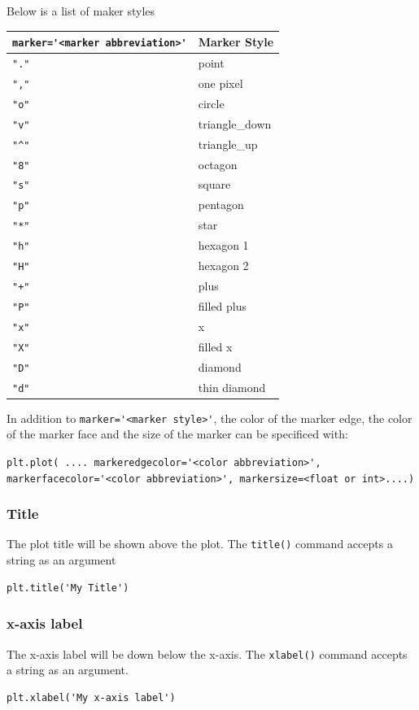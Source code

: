 \documentclass{book}
\begin{document}
Below is a list of maker styles

\begin{longtable}[]{@{}ll@{}}
\toprule
\lstinline!marker='<marker abbreviation>'! & Marker Style\tabularnewline
\midrule
\endhead
\lstinline!"."! & point\tabularnewline
\lstinline!","! & one pixel\tabularnewline
\lstinline!"o"! & circle\tabularnewline
\lstinline!"v"! & triangle\_down\tabularnewline
\lstinline!"^"! & triangle\_up\tabularnewline
\lstinline!"8"! & octagon\tabularnewline
\lstinline!"s"! & square\tabularnewline
\lstinline!"p"! & pentagon\tabularnewline
\lstinline!"*"! & star\tabularnewline
\lstinline!"h"! & hexagon 1\tabularnewline
\lstinline!"H"! & hexagon 2\tabularnewline
\lstinline!"+"! & plus\tabularnewline
\lstinline!"P"! & filled plus\tabularnewline
\lstinline!"x"! & x\tabularnewline
\lstinline!"X"! & filled x\tabularnewline
\lstinline!"D"! & diamond\tabularnewline
\lstinline!"d"! & thin diamond\tabularnewline
\bottomrule
\end{longtable}

In addition to \lstinline!marker='<marker style>'!, the color of the
marker edge, the color of the marker face and the size of the marker can
be specificed with:

\lstinline!plt.plot( .... markeredgecolor='<color abbreviation>', markerfacecolor='<color abbreviation>', markersize=<float or int>....)!

    \subsubsection{Title}\label{title}

The plot title will be shown above the plot. The \lstinline!title()!
command accepts a string as an argument

\begin{lstlisting}
plt.title('My Title')
\end{lstlisting}

    \subsubsection{x-axis label}\label{x-axis-label}

The x-axis label will be down below the x-axis. The \lstinline!xlabel()!
command accepts a string as an argument.

\begin{lstlisting}
plt.xlabel('My x-axis label')
\end{lstlisting}
\end{document}
